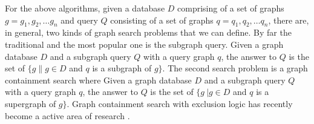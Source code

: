 For the above algorithms, given a database $D$ comprising of a set of graphs $g=g_1 ,g_2 ,\ldots g_n$ and query $Q$ consisting of a set of graphs 
$q=q_1 ,q_2 ,\ldots q_n$, there are, in general, two kinds of graph search problems that we can define. By far the traditional and the most popular 
one is the subgraph query. Given a graph database $D$ and a subgraph query $Q$ with  a query graph $q$, the answer to $Q$ is the set of $\{g \| g\in D$ 
and $q$ is a subgraph of $g\} $. The second search problem is a graph containment search where Given a graph database $D$ and a subgraph query $Q$ with  
a query graph $q$, the answer to $Q$ is the set of $\{g\ | g\in D$ and $q$ is a supergraph of $g\}$. Graph containment search with exclusion logic has 
recently become a  active area of research \cite{chen2007_cindex} \cite{zhang_gao_wu2011}.  


